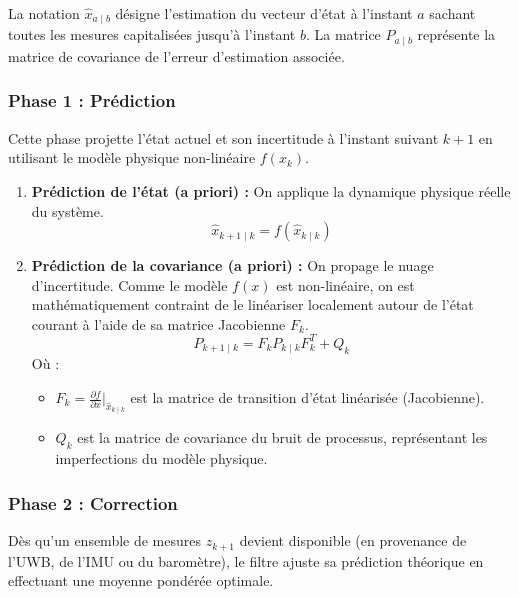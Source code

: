 \documentclass[../Formulations_Kalman.tex]{subfiles}
\begin{document}
La notation $\hat{x}_{a\mid b}$ désigne l'estimation du vecteur d'état à l'instant $a$ sachant toutes les mesures capitalisées jusqu'à l'instant $b$. La matrice $P_{a\mid b}$ représente la matrice de covariance de l'erreur d'estimation associée.

\subsubsection{Phase 1 : Prédiction}
Cette phase projette l'état actuel et son incertitude à l'instant suivant $k+1$ en utilisant le modèle physique non-linéaire $f(x_k)$.

\begin{enumerate}
    \item \textbf{Prédiction de l'état (a priori) :}
    On applique la dynamique physique réelle du système.
    \begin{equation}
    \hat{x}_{k+1\mid k} = f(\hat{x}_{k\mid k})
    \end{equation}
    
    \item \textbf{Prédiction de la covariance (a priori) :}
    On propage le nuage d'incertitude. Comme le modèle $f(x)$ est non-linéaire, on est mathématiquement contraint de le linéariser localement autour de l'état courant à l'aide de sa matrice Jacobienne $F_k$.
    \begin{equation}
    P_{k+1\mid k} = F_k P_{k\mid k} F_k^T + Q_k
    \end{equation}
    Où :
    \begin{itemize}
        \item $F_k = \frac{\partial f}{\partial x}\Big|_{\hat{x}_{k\mid k}}$ est la matrice de transition d'état linéarisée (Jacobienne).
        \item $Q_k$ est la matrice de covariance du bruit de processus, représentant les imperfections du modèle physique.
    \end{itemize}
\end{enumerate}

\subsubsection{Phase 2 : Correction}
Dès qu'un ensemble de mesures $z_{k+1}$ devient disponible (en provenance de l'UWB, de l'IMU ou du baromètre), le filtre ajuste sa prédiction théorique en effectuant une moyenne pondérée optimale.
\end{document}
